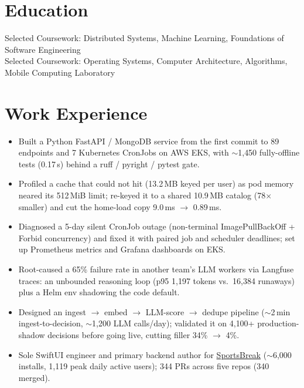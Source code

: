 \documentclass[11pt, letterpaper]{article}
\begin{document}

\section{Education}
Selected Coursework: Distributed Systems, Machine Learning, Foundations of Software Engineering\\[1pt]
Selected Coursework: Operating Systems, Computer Architecture, Algorithms, Mobile Computing Laboratory

\section{Work Experience}
\begin{itemize}
  \item Built a Python FastAPI / MongoDB service from the first commit to 89 endpoints and 7 Kubernetes CronJobs on AWS EKS, with $\sim$1{,}450 fully-offline tests (0.17\,s) behind a ruff / pyright / pytest gate.
  \item Profiled a cache that could not hit (13.2\,MB keyed per user) as pod memory neared its 512\,MiB limit; re-keyed it to a shared 10.9\,MB catalog (78$\times$ smaller) and cut the home-load copy 9.0\,ms $\to$ 0.89\,ms.
  \item Diagnosed a 5-day silent CronJob outage (non-terminal ImagePullBackOff + Forbid concurrency) and fixed it with paired job and scheduler deadlines; set up Prometheus metrics and Grafana dashboards on EKS.
  \item Root-caused a 65\% failure rate in another team's LLM workers via Langfuse traces: an unbounded reasoning loop (p95 1{,}197 tokens vs.\ 16{,}384 runaways) plus a Helm env shadowing the code default.
  \item Designed an ingest $\to$ embed $\to$ LLM-score $\to$ dedupe pipeline ($\sim$2\,min ingest-to-decision, $\sim$1{,}200 LLM calls/day); validated it on 4{,}100+ production-shadow decisions before going live, cutting filler 34\% $\to$ 4\%.
  \item Sole SwiftUI engineer and primary backend author for \href{https://apps.apple.com/app/id6762649287}{SportsBreak} ($\sim$6{,}000 installs, 1{,}119 peak daily active users); 344 PRs across five repos (340 merged).
\end{itemize}
\end{document}
